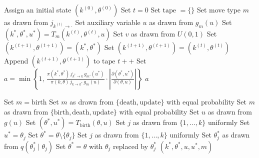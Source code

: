 \documentclass[10pt]{article}
\begin{document}
\begin{algorithm}[h!]
	\caption{Reversible Jump Metropolis–Hastings sampler}
	\label{alg:rjmcmc}
	\begin{algorithmic}[1]
		\State Assign an initial state $(k^{(0)}, \theta^{(0)})$
		\State Set $t = 0$
		\State Set $\text{tape } = \{\}$
			\State Set move type $m$ as drawn from $j_{k^{(t)} \to \cdot}$
			\State Set auxiliary variable $u$ as drawn from $g_{m}(u)$
			\State Set $(k^*, \theta^*, u^*) = T_m(k^{(t)}, \theta^{(t)}, u)$
			\State Set $v$ as drawn from $U(0, 1)$
				\State Set $(k^{(t+1)}, \theta^{(t+1)}) = (k^*, \theta^*)$
			\Else
				\State Set $(k^{(t+1)}, \theta^{(t+1)}) = (k^{(t)}, \theta^{(t)})$
			\EndIf
			\State Append $(k^{(t+1)}, \theta^{(t+1)})$ to $\text{tape}$
			\State $t++$
		\EndFor
		\State {}
		\Statex
			\State Set $a = \min\left\{
			1,\,
			\frac{
			  \pi(k^*, \theta^*)\,
			  j_{k^* \to k}\,
			  g_{m'}(u^*)
			}{
			  \pi(k, \theta)\,
			  j_{k \to k^*}\,
			  g_{m}(u)
			}
			\cdot
			\left|\frac{\partial(\theta^*, u^*)}{\partial(\theta, u)}\right|
			\right\}$
			\State \Return $a$
		\EndFunction
	\end{algorithmic}
\end{algorithm}

 
\begin{algorithm}[h!]
    \caption{Three-move proposal function}
    \label{alg:rprop}
    \begin{algorithmic}[1]
                \State Set $m = \text{birth}$
                \State Set $m$ as drawn from $\{\text{death}, \text{update}\}$ with equal probability
            \Else
                \State Set $m$ as drawn from $\{\text{birth}, \text{death}, \text{update}\}$ with equal probability
            \EndIf
                \State Set $u$ as drawn from $g(u)$
                \State Set $(\theta^*, u^*) = T_{\text{birth}}(\theta, u)$ 
                \State Set $j$ as drawn from $\{1, \ldots, k\}$ uniformly
                \State Set $u^* = \theta_j$
                \State Set $\theta^* = \theta \setminus \{\theta_j\}$
            \Else {}
                \State Set $j$ as drawn from $\{1, \ldots, k\}$ uniformly
                \State Set $\theta^*_j$ as drawn from $q(\theta^*_j \mid \theta_j)$
                \State Set $\theta^* = \theta$ with $\theta_j$ replaced by $\theta^*_j$
            \EndIf
            \State \Return $(k^*, \theta^*, u, u^*, m)$
        \EndFunction
    \end{algorithmic}
\end{algorithm}
\end{document}
